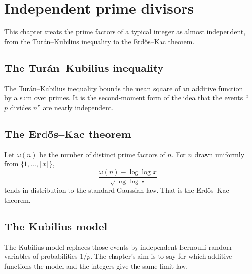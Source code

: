 \chapter{Independent prime divisors}\label{ch:oc-divisors}

This chapter treats the prime factors of a typical integer as almost independent, from the Tur\'an--Kubilius inequality to the Erd\H os--Kac theorem.

\section{The Tur\'an--Kubilius inequality}

The Tur\'an--Kubilius inequality bounds the mean square of an additive function by a sum over primes. It is the second-moment form of the idea that the events ``$p$ divides $n$'' are nearly independent.

\section{The Erd\H os--Kac theorem}

Let $\omega(n)$ be the number of distinct prime factors of $n$. For $n$ drawn uniformly from $\{1,\ldots,\lfloor x\rfloor\}$,
\[
\frac{\omega(n)-\log\log x}{\sqrt{\log\log x}}
\]
tends in distribution to the standard Gaussian law. That is the Erd\H os--Kac theorem.

\section{The Kubilius model}

The Kubilius model replaces those events by independent Bernoulli random variables of probabilities $1/p$. The chapter's aim is to say for which additive functions the model and the integers give the same limit law.
